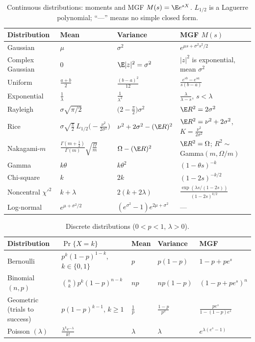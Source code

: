 \begin{table}[htbp]\centering\footnotesize
\caption{Continuous distributions: moments and MGF $M(s)=\E e^{sX}$. $L_{1/2}$ is a Laguerre
polynomial; ``---'' means no simple closed form.}\label{tab:appA:moments}
\renewcommand{\arraystretch}{1.55}
\begin{tabular}{@{}llll@{}}
\toprule
Distribution & Mean & Variance & MGF $M(s)$\\
\midrule
Gaussian & $\mu$ & $\sigma^2$ & $e^{\mu s+\sigma^2s^2/2}$\\
Complex Gaussian & $0$ & $\E|z|^2=\sigma^2$ & $|z|^2$ is exponential, mean $\sigma^2$\\
Uniform & $\frac{a+b}2$ & $\frac{(b-a)^2}{12}$ & $\frac{e^{sb}-e^{sa}}{s(b-a)}$\\
Exponential & $\frac1\lambda$ & $\frac1{\lambda^2}$ & $\frac{\lambda}{\lambda-s}$, $s<\lambda$\\
Rayleigh & $\sigma\sqrt{\pi/2}$ & $\big(2-\frac\pi2\big)\sigma^2$ & $\E R^2=2\sigma^2$\\
Rice & $\sigma\sqrt{\frac\pi2}\,L_{1/2}\big(-\frac{\nu^2}{2\sigma^2}\big)$ & $\nu^2+2\sigma^2-(\E R)^2$ & $\E R^2=\nu^2+2\sigma^2$, $K=\frac{\nu^2}{2\sigma^2}$\\
Nakagami-$m$ & $\frac{\Gamma(m+\frac12)}{\Gamma(m)}\sqrt{\frac\Omega m}$ & $\Omega-(\E R)^2$ & $\E R^2=\Omega$; $R^2\sim$ Gamma$(m,\Omega/m)$\\
Gamma & $k\theta$ & $k\theta^2$ & $(1-\theta s)^{-k}$\\
Chi-square & $k$ & $2k$ & $(1-2s)^{-k/2}$\\
Noncentral $\chi'^2$ & $k+\lambda$ & $2(k+2\lambda)$ & $\frac{\exp(\lambda s/(1-2s))}{(1-2s)^{k/2}}$\\
Log-normal & $e^{\mu+\sigma^2/2}$ & $(e^{\sigma^2}-1)e^{2\mu+\sigma^2}$ & ---\\
\bottomrule
\end{tabular}
\end{table}

\begin{table}[htbp]\centering\small
\caption{Discrete distributions ($0<p<1$, $\lambda>0$).}\label{tab:appA:discrete}
\renewcommand{\arraystretch}{1.35}
\begin{tabular}{@{}lllll@{}}
\toprule
Distribution & $\Pr\{X=k\}$ & Mean & Variance & MGF\\
\midrule
Bernoulli & $p^k(1-p)^{1-k}$, $k\in\{0,1\}$ & $p$ & $p(1-p)$ & $1-p+pe^s$\\
Binomial $(n,p)$ & $\binom nk p^k(1-p)^{n-k}$ & $np$ & $np(1-p)$ & $(1-p+pe^s)^n$\\
Geometric (trials to success) & $p(1-p)^{k-1}$, $k\ge1$ & $\frac1p$ & $\frac{1-p}{p^2}$ & $\frac{pe^s}{1-(1-p)e^s}$\\
Poisson $(\lambda)$ & $\frac{\lambda^ke^{-\lambda}}{k!}$ & $\lambda$ & $\lambda$ & $e^{\lambda(e^s-1)}$\\
\bottomrule
\end{tabular}
\end{table}

